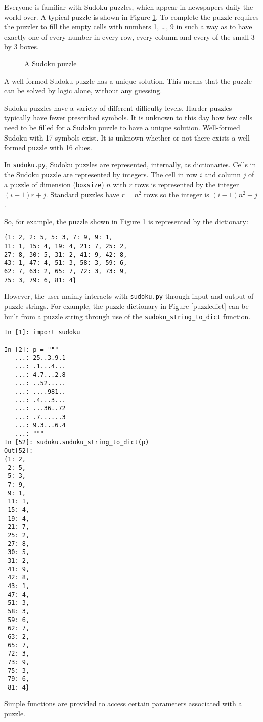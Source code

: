 Everyone is familiar with Sudoku puzzles, which appear in newspapers daily the world over. A typical puzzle is shown in Figure \ref{sudokuexampleone}. To complete the puzzle requires the puzzler to fill the empty cells with numbers 1, \ldots , 9 in such a way as to have exactly one of every number in every row, every column and every of the small 3 by 3 boxes.

\begin{figure}[h]
\label{sudokuexampleone}
\centering
  \sudokuexampleone
\caption{A Sudoku puzzle}
\end{figure}

A well-formed Sudoku puzzle has a unique solution. This means that the puzzle can be solved by logic alone, without any guessing.

Sudoku puzzles have a variety of different difficulty levels. Harder puzzles typically have fewer prescribed symbols. It is unknown to this day how few cells need to be filled for a Sudoku puzzle to have a unique solution. Well-formed Sudoku with 17 symbols exist. It is unknown whether or not there exists a well-formed puzzle with 16 clues.

In \texttt{sudoku.py}, Sudoku puzzles are represented, internally, as dictionaries. Cells in the Sudoku puzzle are represented by integers. The cell in row $i$ and column $j$ of a puzzle of dimension (\texttt{boxsize}) $n$ with $r$ rows is represented by the integer $(i - 1)r + j$. Standard puzzles have $r = n^2$ rows so the integer is $(i - 1)n^2 + j$. 

So, for example, the puzzle shown in Figure \ref{sudokuexampleone} is represented by the dictionary:

\begin{lstlisting}[caption=Sudoku puzzle dictionary,label=puzzledict]
{1: 2, 2: 5, 5: 3, 7: 9, 9: 1, 
11: 1, 15: 4, 19: 4, 21: 7, 25: 2, 
27: 8, 30: 5, 31: 2, 41: 9, 42: 8, 
43: 1, 47: 4, 51: 3, 58: 3, 59: 6, 
62: 7, 63: 2, 65: 7, 72: 3, 73: 9, 
75: 3, 79: 6, 81: 4}
\end{lstlisting}

However, the user mainly interacts with \texttt{sudoku.py} through input and output of puzzle strings. For example, the puzzle dictionary in Figure \ref{puzzledict} can be built from a puzzle string through use of the \texttt{sudoku\_string\_to\_dict} function.

\begin{lstlisting}[caption=Building a Sudoku dictionary,label=stringtodict]
In [1]: import sudoku

In [2]: p = """
   ...: 25..3.9.1
   ...: .1...4...
   ...: 4.7...2.8
   ...: ..52.....
   ...: ....981..
   ...: .4...3...
   ...: ...36..72
   ...: .7......3
   ...: 9.3...6.4
   ...: """
In [52]: sudoku.sudoku_string_to_dict(p)
Out[52]: 
{1: 2,
 2: 5,
 5: 3,
 7: 9,
 9: 1,
 11: 1,
 15: 4,
 19: 4,
 21: 7,
 25: 2,
 27: 8,
 30: 5,
 31: 2,
 41: 9,
 42: 8,
 43: 1,
 47: 4,
 51: 3,
 58: 3,
 59: 6,
 62: 7,
 63: 2,
 65: 7,
 72: 3,
 73: 9,
 75: 3,
 79: 6,
 81: 4}

\end{lstlisting}

Simple functions are provided to access certain parameters associated with a puzzle.



